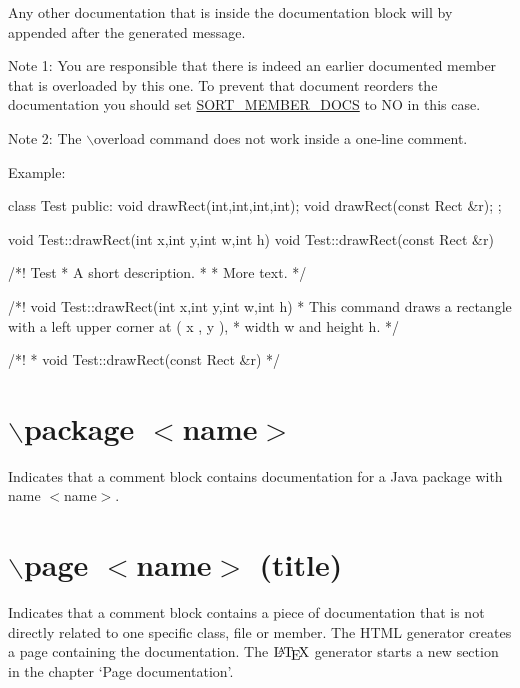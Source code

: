 Any other documentation that is inside the documentation block will by appended after the generated message.

\begin{DoxyParagraph}{Note 1:}
You are responsible that there is indeed an earlier documented member that is overloaded by this one. To prevent that document reorders the documentation you should set \hyperlink{config_cfg_sort_member_docs}{SORT\_\-MEMBER\_\-DOCS} to NO in this case. 
\end{DoxyParagraph}
\begin{DoxyParagraph}{Note 2:}
The $\backslash$overload command does not work inside a one-\/line comment. 
\end{DoxyParagraph}
\begin{DoxyParagraph}{Example:}

\begin{DoxyVerbInclude}
class Test 
{
  public:
    void drawRect(int,int,int,int);
    void drawRect(const Rect &r);
};

void Test::drawRect(int x,int y,int w,int h) {}
void Test::drawRect(const Rect &r) {}

/*! \class Test
 *  \brief A short description.
 *   
 *  More text.
 */

/*! \fn void Test::drawRect(int x,int y,int w,int h)
 * This command draws a rectangle with a left upper corner at ( \a x , \a y ),
 * width \a w and height \a h. 
 */

/*!
 * \overload void Test::drawRect(const Rect &r)
 */

\end{DoxyVerbInclude}
 
\end{DoxyParagraph}


 \hypertarget{commands_cmdpackage}{}\section{$\backslash$package $<$name$>$}\label{commands_cmdpackage}
 Indicates that a comment block contains documentation for a Java package with name $<$name$>$.



 \hypertarget{commands_cmdpage}{}\section{$\backslash$page $<$name$>$ (title)}\label{commands_cmdpage}
 Indicates that a comment block contains a piece of documentation that is not directly related to one specific class, file or member. The HTML generator creates a page containing the documentation. The $\mbox{\LaTeX}$ generator starts a new section in the chapter `Page documentation'.

